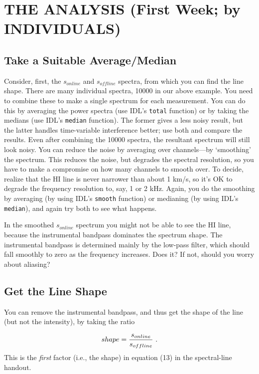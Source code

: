\documentclass[12pt,preprint]{aastex}
\begin{document}
\section{THE ANALYSIS (First Week; by INDIVIDUALS)} \label{analysis}

\subsection{Take a Suitable Average/Median}
Consider, first, the $s_{online}$ and $s_{offline}$ spectra, from which
you can find the line shape. There are many individual spectra, 10000 in
our above example. You need to combine these to make a single spectrum
for each measurement. You can do this by averaging the power spectra
(use IDL's {\tt total} function) or by taking the medians (use IDL's
{\tt median} function). The former gives a less noisy result, but the
latter handles time-variable interference better; use both and compare
the results. Even after combining the 10000 spectra, the resultant
spectrum will still look noisy.  You can reduce the noise by averaging
over channels---by `smoothing' the spectrum. This reduces the noise, but
degrades the spectral resolution, so you have to make a compromise on
how many channels to smooth over. To decide, realize that the HI line is
never narrower than about 1 km/s, so it's OK to degrade the frequency
resolution to, say, 1 or 2 kHz. Again, you do the smoothing by averaging
(by using IDL's {\tt smooth} function) or medianing (by using IDL's {\tt
  median}), and again try both to see what happens.

In the smoothed $s_{online}$ spectrum you might not be able to see the
HI line, because the instrumental bandpass dominates the spectrum
shape. The instrumental bandpass is determined mainly by the low-pass
filter, which should fall smoothly to zero as the frequency
increases. Does it? If not, should you worry about aliasing?

\subsection{Get the Line Shape}

You can remove the instrumental bandpass, and thus get the shape
of the line (but not the intensity), by taking the ratio 

\begin{equation}
shape = {s_{online} \over s_{offline}} \ .
\end{equation}
%
This is the {\it first} factor (i.e., the shape) in equation
(13) in the spectral-line handout.
%
\end{document}
